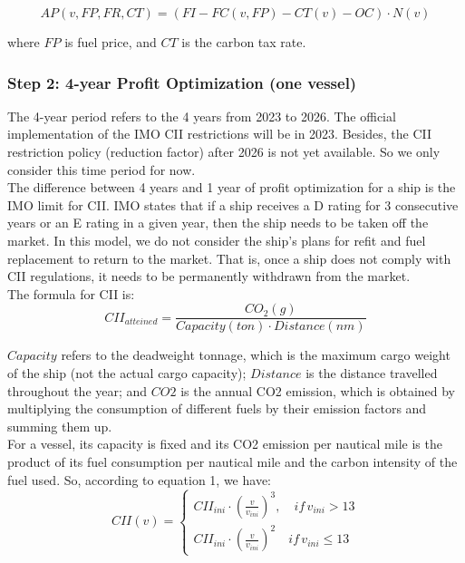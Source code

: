 \documentclass[a4paper,12pt]{article}
\begin{document}
\begin{equation}
	\label{eq:annual_profit}
	AP(v, FP, FR, CT) = (FI-FC(v, FP)-CT(v)-OC) \cdot N(v)
\end{equation}

where $FP$ is fuel price, and $CT$ is the carbon tax rate.


\subsubsection{Step 2: 4-year Profit Optimization (one vessel)}
The 4-year period refers to the 4 years from 2023 to 2026. The official implementation of the IMO CII restrictions will be in 2023.
Besides, the CII restriction policy (reduction factor) after 2026 is not yet available.
So we only consider this time period for now.\\

The difference between 4 years and 1 year of profit optimization for a ship is the IMO limit for CII.
IMO states that if a ship receives a D rating for 3 consecutive years or an E rating in a given year, then the ship needs to be taken off the market.
In this model, we do not consider the ship's plans for refit and fuel replacement to return to the market.
That is, once a ship does not comply with CII regulations, it needs to be permanently withdrawn from the market.\\

The formula for CII is:
\begin{equation}
	\label{eq:cii}
	CII_{atteined} = \frac{CO_2(g)}{Capacity(ton) \cdot Distance(nm)}
\end{equation}

$Capacity$ refers to the deadweight tonnage, which is the maximum cargo weight of the ship (not the actual cargo capacity);
$Distance$ is the distance travelled throughout the year;
and $CO2$ is the annual CO2 emission, which is obtained by multiplying the consumption of different fuels by their emission factors and summing them up.\\

For a vessel, its capacity is fixed and its CO2 emission per nautical mile is the product of its fuel consumption per nautical mile and the carbon intensity of the fuel used.
So, according to equation 1, we have:
\begin{equation}
	\label{eq:cii_model}
	CII(v) =
	\left\{
	\begin{aligned}
		CII_{ini}\cdot (\frac{v}{v_{ini}})^3, \quad if \, v_{ini} > 13 \\
		CII_{ini} \cdot (\frac{v}{v_{ini}})^2 \quad if \, v_{ini}\leq 13
	\end{aligned}
	\right.
\end{equation}
\end{document}
